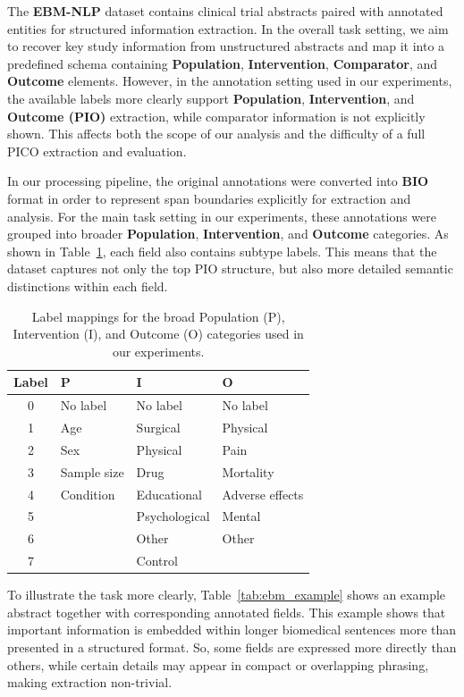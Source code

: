 \documentclass{article}
\begin{document}
The \textbf{EBM-NLP} dataset contains clinical trial abstracts paired with annotated entities for structured information extraction. In the overall task setting, we aim to recover key study information from unstructured abstracts and map it into a predefined schema containing \textbf{Population}, \textbf{Intervention}, \textbf{Comparator}, and \textbf{Outcome} elements. However, in the annotation setting used in our experiments, the available labels more clearly support \textbf{Population}, \textbf{Intervention}, and \textbf{Outcome (PIO)} extraction, while comparator information is not explicitly shown. This affects both the scope of our analysis and the difficulty of a full PICO extraction and evaluation.

In our processing pipeline, the original annotations were converted into \textbf{BIO} format in order to represent span boundaries explicitly for extraction and analysis. For the main task setting in our experiments, these annotations were grouped into broader \textbf{Population}, \textbf{Intervention}, and \textbf{Outcome} categories. As shown in Table~\ref{tab:pio_labels}, each field also contains subtype labels. This means that the dataset captures not only the top PIO structure, but also more detailed semantic distinctions within each field.

\begin{table}[ht]
\centering
\small
\begin{tabular}{c l l l}
\hline
\textbf{Label} & \textbf{P} & \textbf{I} & \textbf{O} \\
\hline
0 & No label & No label & No label \\
1 & Age & Surgical & Physical \\
2 & Sex & Physical & Pain \\
3 & Sample size & Drug & Mortality \\
4 & Condition & Educational & Adverse effects \\
5 &  & Psychological & Mental \\
6 &  & Other & Other \\
7 &  & Control &  \\
\hline
\end{tabular}
\caption{Label mappings for the broad Population (P), Intervention (I), and Outcome (O) categories used in our experiments.}
\label{tab:pio_labels}
\end{table}
To illustrate the task more clearly, Table~\ref{tab:ebm_example} shows an example abstract together with corresponding annotated fields. This example shows that important information is embedded within longer biomedical sentences more than presented in a structured format. So, some fields are expressed more directly than others, while certain details may appear in compact or overlapping phrasing, making extraction non-trivial.
\end{document}
